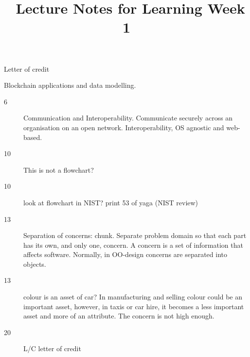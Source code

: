\documentclass[]{article}
\newcommand{\theweek}{1}
\begin{document}
\title{\moduleCode\ Lecture Notes for Learning Week \theweek }
\author{\moduleLeader}
\maketitle

 Letter of credit
\glsaddall
\printglossaries

Blockchain applications and data modelling.

\begin{description}
	\item [6] Communication and Interoperability. Communicate securely across an organisation on an open network. Interoperability, OS agnostic and web-based.
	\item[10] This is not  a flowchart?	
	\item[10] look at flowchart in NIST? print 53 of yaga (NIST review)
	\item[13] Separation of concerns: chunk. Separate problem domain so that each part has its own, and only one, concern. A concern is a set of information that affects software. Normally, in OO-design concerns are separated into objects.
	\item[13] colour is an asset of car? In manufacturing and selling colour could be an important asset, however, in taxis or car hire, it becomes a less important asset and more of an attribute. The concern is not high enough.
	\item[20] L/C letter of credit
		

\end{description}
\end{document}
